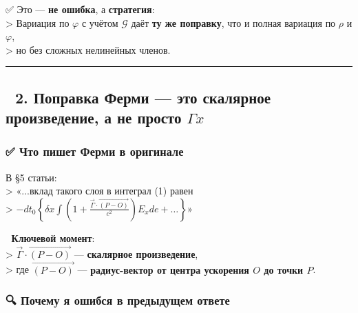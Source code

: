 \documentclass[11pt]{article}
\begin{document}
✅ Это --- \textbf{не ошибка}, а \textbf{стратегия}:\\
\textgreater{} Вариация по \(\varphi\) с учётом \(\mathcal{G}\) даёт
\textbf{ту же поправку}, что и полная вариация по \(\rho\) и
\(\varphi\),\\
\textgreater{} но без сложных нелинейных членов.

\begin{center}\rule{0.5\linewidth}{\linethickness}\end{center}

\subsection{\texorpdfstring{🔹 2. Поправка Ферми --- это скалярное
произведение, а не просто
\(\Gamma x\)}{🔹 2. Поправка Ферми --- это скалярное произведение, а не просто \textbackslash{}Gamma x}}\label{ux43fux43eux43fux440ux430ux432ux43aux430-ux444ux435ux440ux43cux438-ux44dux442ux43e-ux441ux43aux430ux43bux44fux440ux43dux43eux435-ux43fux440ux43eux438ux437ux432ux435ux434ux435ux43dux438ux435-ux430-ux43dux435-ux43fux440ux43eux441ux442ux43e-gamma-x}

\subsubsection{✅ Что пишет Ферми в
оригинале}\label{ux447ux442ux43e-ux43fux438ux448ux435ux442-ux444ux435ux440ux43cux438-ux432-ux43eux440ux438ux433ux438ux43dux430ux43bux435}

В §5 статьи:\\
\textgreater{} «...вклад такого слоя в интеграл (1) равен\\
\textgreater{}
\(- dt_0 \left\{ \delta x \int \left(1 + \frac{\vec{\Gamma} \cdot \overrightarrow{(P - O)}}{c^2}\right) E_x de + \dots \right\}\)»

📌 \textbf{Ключевой момент}:\\
\textgreater{} \(\vec{\Gamma} \cdot \overrightarrow{(P - O)}\) ---
\textbf{скалярное произведение},\\
\textgreater{} где \(\overrightarrow{(P - O)}\) ---
\textbf{радиус-вектор от центра ускорения \(O\) до точки \(P\)}.

\subsubsection{🔍 Почему я ошибся в предыдущем
ответе}\label{ux43fux43eux447ux435ux43cux443-ux44f-ux43eux448ux438ux431ux441ux44f-ux432-ux43fux440ux435ux434ux44bux434ux443ux449ux435ux43c-ux43eux442ux432ux435ux442ux435-1}
\end{document}
